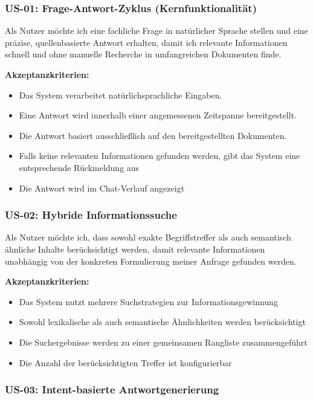 \subsubsection*{US-01: Frage-Antwort-Zyklus (Kernfunktionalität)}

Als Nutzer möchte ich eine fachliche Frage in natürlicher Sprache stellen und eine präzise, quellenbasierte Antwort erhalten, damit ich relevante Informationen schnell und ohne manuelle Recherche in umfangreichen Dokumenten finde.

\textbf{Akzeptanzkriterien:}
\begin{itemize}
\item Das System verarbeitet natürlichsprachliche Eingaben.
\item Eine Antwort wird innerhalb einer angemessenen Zeitspanne bereitgestellt.
\item Die Antwort basiert ausschließlich auf den bereitgestellten Dokumenten.
\item Falls keine relevanten Informationen gefunden werden, gibt das System eine entsprechende Rückmeldung aus
\item Die Antwort wird im Chat-Verlauf angezeigt
\end{itemize}

\subsubsection*{US-02: Hybride Informationssuche}

Als Nutzer möchte ich, dass sowohl exakte Begriffstreffer als auch semantisch ähnliche Inhalte berücksichtigt werden, damit relevante Informationen unabhängig von der konkreten Formulierung meiner Anfrage gefunden werden.

\textbf{Akzeptanzkriterien:}
\begin{itemize}
\item Das System nutzt mehrere Suchstrategien zur Informationsgewinnung
\item Sowohl lexikalische als auch semantische Ähnlichkeiten werden berücksichtigt
\item Die Suchergebnisse werden zu einer gemeinsamen Rangliste zusammengeführt
\item Die Anzahl der berücksichtigten Treffer ist konfigurierbar
\end{itemize}

\subsubsection*{US-03: Intent-basierte Antwortgenerierung}


